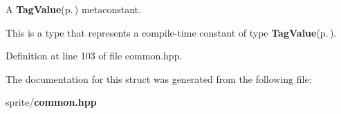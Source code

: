 A {\bf Tag\-Value}{\rm (p.\,\pageref{structsprite_1_1meta_1_1TagValue})} metaconstant. 

This is a type that represents a compile-time constant of type {\bf Tag\-Value}{\rm (p.\,\pageref{structsprite_1_1meta_1_1TagValue})}. 



Definition at line 103 of file common.hpp.

The documentation for this struct was generated from the following file:\begin{CompactItemize}
\item 
sprite/{\bf common.hpp}\end{CompactItemize}
